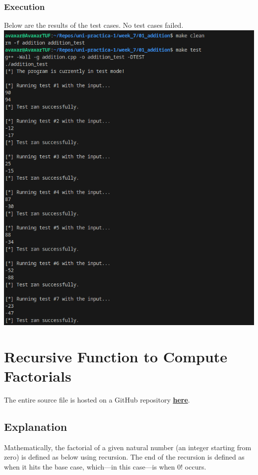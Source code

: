\documentclass[12pt]{article}
\begin{document}
\subsubsection{Execution}
Below are the results of the test cases. No test cases failed.
\newline\includegraphics[width=\textwidth]{01_addition_test}

\pagebreak
\section{Recursive Function to Compute Factorials}
The entire source file is hosted on a GitHub repository \href{https://github.com/avaxar/uni-practica-1/tree/main/week_7/02_factorial}{\textbf{here}}.

\subsection{Explanation}

Mathematically, the factorial of a given natural number (an integer starting from zero) is defined as below using recursion. The end of the recursion is defined as when it hits the base case, which---in this case---is when $0!$ occurs.
\end{document}
